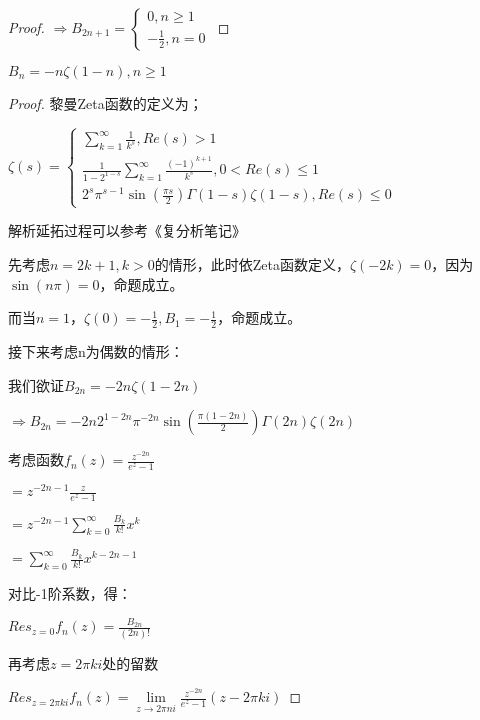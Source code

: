 \documentclass[12pt, a4paper, oneside, UTF8]{ctexbook}
\begin{document}
\begin{para}{0}
\begin{para}{1}
\begin{proof}
						$\Rightarrow B_{2n+1}=\begin{cases}
							0,n\geqslant 1 \\
							-\frac{1}{2},n=0 
						\end{cases}$
					\end{proof}
					\point{}
					\begin{proposition}
						$B_n=-n\zeta(1-n),n\geqslant 1$
					\end{proposition}
					
					\begin{proof}
						黎曼Zeta函数的定义为；
						
						$\zeta(s)=\begin{cases}
							\sum\limits_{k=1}^{\infty}\frac{1}{k^s},Re(s)>1 \\
							\frac{1}{1-2^{1-s}}\sum\limits_{k=1}^{\infty}\frac{(-1)^{k+1}}{k^s},0< Re(s) \leqslant 1 \\
							2^s \pi^{s-1} \sin\left(\frac{\pi s}{2}\right)\Gamma(1-s)\zeta(1-s),Re(s)\leqslant 0
						\end{cases}$
						
						解析延拓过程可以参考《复分析笔记》
						
						先考虑$n=2k+1,k>0$的情形，此时依Zeta函数定义，$\zeta(-2k)=0$，因为$\sin(n\pi)=0$，命题成立。
						
						而当$n=1$，$\zeta(0)=-\frac{1}{2},B_1=-\frac{1}{2}$，命题成立。
						
						接下来考虑n为偶数的情形：
						
						我们欲证$B_{2n} = -2n\zeta(1-2n)$
						
						$\Rightarrow B_{2n} = -2n 2^{1-2n} \pi^{-2n} \sin\left(\frac{\pi (1-2n)}{2}\right)\Gamma(2n)\zeta(2n)$
						
						考虑函数$f_n(z) = \frac{z^{-2n}}{e^z -1}$
						
						$=z^{-2n-1}\frac{z}{e^z-1}$
						
						$=z^{-2n-1}\sum\limits_{k=0}^{\infty} \frac{B_k}{k!}x^k$
						
						$=\sum\limits_{k=0}^{\infty} \frac{B_k}{k!}x^{k-2n-1}$
						
						对比-1阶系数，得：
						
						$Res_{z=0} f_n(z) = \frac{B_{2n}}{(2n)!}$
						
						再考虑$z=2\pi ki$处的留数
						
						$Res_{z=2\pi ki} f_n(z) = \lim\limits_{z\to 2\pi ni} \frac{z^{-2n}}{e^z-1}(z-2\pi ki)$
						

\end{proof}
\end{para}
\end{para}
\end{document}
